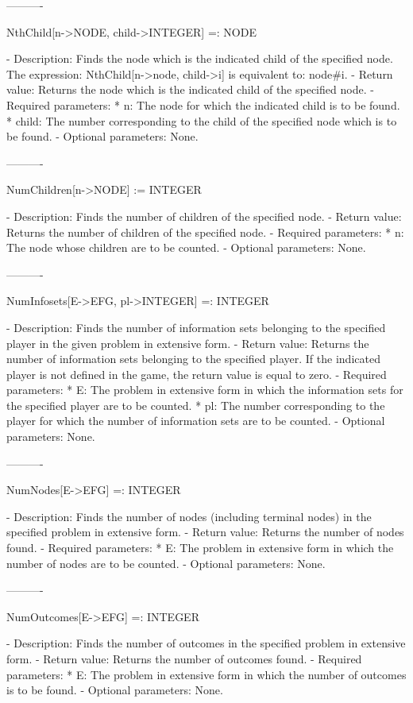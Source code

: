 ----------

NthChild[n->NODE, child->INTEGER] =: NODE

   -	Description:  Finds the node which is the indicated child of the 
	specified node.  The expression:  NthChild[n->node, child->i] is 
	equivalent to:  node\#i.
   -	Return value:  Returns the node which is the indicated child of the
	specified node.
   -	Required parameters:
	  *  n:  The node for which the indicated child is to be found.
	  *  child:  The number corresponding to the child of the specified 
		node which is to be found.
   -	Optional parameters:  None.

----------

NumChildren[n->NODE] := INTEGER

   -	Description:  Finds the number of children of the specified node.
   -	Return value:  Returns the number of children of the specified node.
   -	Required parameters:
	  *  n:  The node whose children are to be counted.
   -	Optional parameters:  None.

----------

NumInfosets[E->EFG, pl->INTEGER] =: INTEGER

   -	Description:  Finds the number of information sets belonging to the
	specified player in the given problem in extensive form.
   -	Return value:  Returns the number of information sets belonging to
	the specified player.  If the indicated player is not defined in the 
	game, the return value is equal to zero.
   -	Required parameters:
	  *  E:  The problem in extensive form in which the information sets
		for the specified player are to be counted.
	  *  pl:  The number corresponding to the player for which the number 
		of information sets are to be counted.
   -	Optional parameters:  None.

----------

NumNodes[E->EFG] =: INTEGER

   -	Description:  Finds the number of nodes (including terminal nodes) in 
	the specified problem in extensive form.
   -	Return value:  Returns the number of nodes found.
   -	Required parameters:
	  *  E:  The problem in extensive form in which the number of nodes are
		to be counted.
   -	Optional parameters:  None.

----------

NumOutcomes[E->EFG] =: INTEGER

   -	Description:  Finds the number of outcomes in the specified problem in
	extensive form.
   -	Return value:  Returns the number of outcomes found.
   -	Required parameters:
	  *  E:  The problem in extensive form in which the number of outcomes
		is to be found.
   -	Optional parameters:  None.


